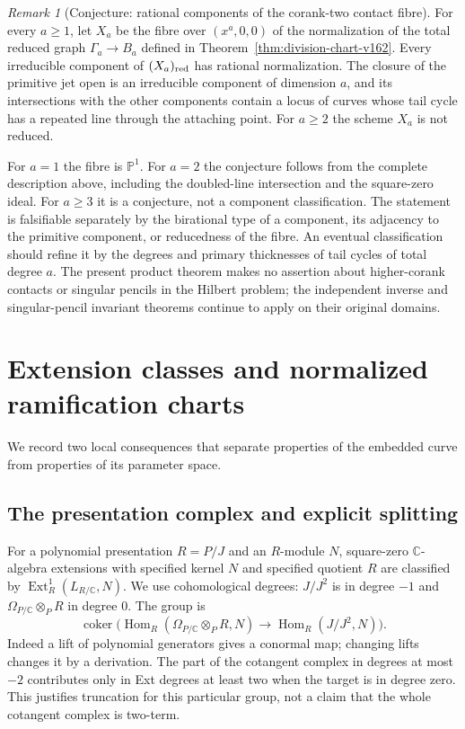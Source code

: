 \documentclass[11pt,reqno]{amsart}
\numberwithin{equation}{section}
\theoremstyle{definition}\newtheorem{definition}[theorem]{Definition}
\theoremstyle{remark}\newtheorem{remark}[theorem]{Remark}
\newcommand{\C}{\mathbb C}\newcommand{\Q}{\mathbb Q}
\newcommand{\Pj}{\mathbb P}\newcommand{\A}{\mathbb A}
\DeclareMathOperator{\Hom}{Hom}\DeclareMathOperator{\Tot}{Tot}
\DeclareMathOperator{\coker}{coker}\DeclareMathOperator{\codim}{codim}
\begin{document}
\begin{remark}[Conjecture: rational components of the corank-two contact fibre]
\label{conj:contact-components-v163}
For every $a\geq1$, let $X_a$ be the fibre over $(x^a,0,0)$ of the
normalization of the total reduced graph $\Gamma_a\to B_a$ defined
in Theorem~\ref{thm:division-chart-v162}. Every irreducible component
of $(X_a)_{\rm red}$ has rational normalization. The closure of the
primitive jet open is an irreducible component of dimension $a$,
and its intersections with the other components contain a locus of
curves whose tail cycle has a repeated line through the attaching
point. For $a\geq2$ the scheme $X_a$ is not reduced.
\end{remark}
For $a=1$ the fibre is $\Pj^1$. For $a=2$ the conjecture follows
from the complete description above, including the doubled-line
intersection and the square-zero ideal. For $a\geq3$ it is a
conjecture, not a component classification. The statement is
falsifiable separately by the birational type of a component, its
adjacency to the primitive component, or reducedness of the fibre.
An eventual classification should refine it by the degrees and
primary thicknesses of tail cycles of total degree $a$. The present
product theorem makes no assertion about higher-corank contacts or
singular pencils in the Hilbert problem; the independent inverse
and singular-pencil invariant theorems continue to apply on their
original domains.


\section{Extension classes and normalized ramification charts}
\label{sec:local-algebra-v167}
We record two local consequences that separate properties of the
embedded curve from properties of its parameter space.

\subsection{The presentation complex and explicit splitting}
For a polynomial presentation $R=P/J$ and an $R$-module $N$,
square-zero $\C$-algebra extensions with specified kernel $N$
and specified quotient $R$ are classified by
$\operatorname{Ext}^1_R(L_{R/\C},N)$. We use cohomological degrees:
$J/J^2$ is in degree $-1$ and
$\Omega_{P/\C}\otimes_PR$ in degree $0$. The group is
\[
 \coker\bigl(\Hom_R(\Omega_{P/\C}\otimes_PR,N)
                       \longrightarrow\Hom_R(J/J^2,N)\bigr).
\]
Indeed a lift of polynomial generators gives a conormal map;
changing lifts changes it by a derivation. The part of the
cotangent complex in degrees at most $-2$ contributes only in
Ext degrees at least two when the target is in degree zero.
This justifies truncation for this particular group, not a claim
that the whole cotangent complex is two-term.
\end{document}

